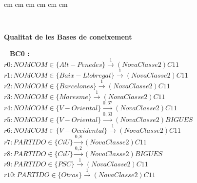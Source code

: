 \pagestyle{plain}
 cm
 cm
 cm
 cm
 cm
 cm

\setlength{\baselineskip}{1.5em}
\setlength{\parskip}{0em}
\setlength{\parsep}{0.5em}
\newcommand{\lge}[1]{\hbox{#1\kern-.1em\raise.5ex\hbox{.}\kern-.1em #1}}
\mbox{ } \vfill
\begin{center} \Large \bf Qualitat de les Bases de coneixement \end{center} \vfill

\newpage
\mbox{ }
{\Large \bf BC0 :}\\

$r0: NOMCOM \in  \{ Alt-Penedes \} \stackrel{1}{\longrightarrow} (NovaClasse2)C11$\\

$r1: NOMCOM \in  \{ Baix-Llobregat \} \stackrel{1}{\longrightarrow} (NovaClasse2)C11$\\

$r2: NOMCOM \in  \{ Barcelones \} \stackrel{1}{\longrightarrow} (NovaClasse2)C11$\\

$r3: NOMCOM \in  \{ Maresme \} \stackrel{1}{\longrightarrow} (NovaClasse2)C11$\\

$r4: NOMCOM \in  \{ V-Oriental \} \stackrel{0,67}{\longrightarrow} (NovaClasse2)C11$\\

$r5: NOMCOM \in  \{ V-Oriental \} \stackrel{0,33}{\longrightarrow} (NovaClasse2)BIGUES$\\

$r6: NOMCOM \in  \{ V-Occidental \} \stackrel{1}{\longrightarrow} (NovaClasse2)C11$\\

$r7: PARTIDO \in  \{ CiU \} \stackrel{0,8}{\longrightarrow} (NovaClasse2)C11$\\

$r8: PARTIDO \in  \{ CiU \} \stackrel{0,2}{\longrightarrow} (NovaClasse2)BIGUES$\\

$r9: PARTIDO \in  \{ PSC \} \stackrel{1}{\longrightarrow} (NovaClasse2)C11$\\

$r10: PARTIDO \in  \{ Otros \} \stackrel{1}{\longrightarrow} (NovaClasse2)C11$\\

